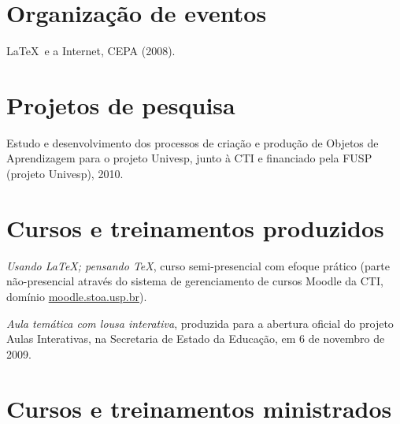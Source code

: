 \section*{Organização de eventos}

\begin{compactitem}
	\item \LaTeX\ e a Internet, CEPA (2008).
\end{compactitem}

\section*{Projetos de pesquisa}

\begin{compactitem}
	\item Estudo e desenvolvimento dos processos de criação e produção de Objetos de Aprendizagem para o projeto Univesp, junto à CTI e financiado pela FUSP (projeto Univesp), 2010.
\end{compactitem}

\section*{Cursos e treinamentos produzidos}

\begin{compactitem}
	\item \textsl{Usando \LaTeX; pensando \TeX}, curso semi-presencial com efoque prático (parte não-presencial através do sistema de gerenciamento de cursos Moodle da CTI, domínio \url{moodle.stoa.usp.br}).
	\item \textsl{Aula temática com lousa interativa}, produzida para a abertura oficial do projeto Aulas Interativas, na Secretaria de Estado da Educação, em 6 de novembro de 2009.
\end{compactitem}

\section*{Cursos e treinamentos ministrados}

